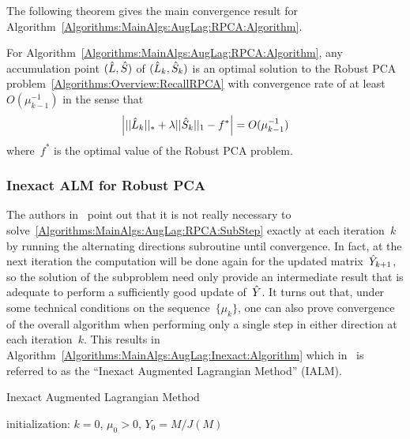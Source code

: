 The following theorem gives the main convergence result for Algorithm~\ref{Algorithms:MainAlgs:AugLag:RPCA:Algorithm}.\\

\begin{theorem}
For Algorithm~\ref{Algorithms:MainAlgs:AugLag:RPCA:Algorithm}, any accumulation point $({\hat{L}},{\hat{S}})$ of $({\hat{L}}_k,{\hat{S}}_k)$ is an optimal solution to the Robust PCA problem~\eqref{Algorithms:Overview:RecallRPCA} with convergence rate of at least~$O(\mu_{k-1}^{-1})$ in the sense that
\begin{align*}
\left| ||{\hat{L}}_k||_* + \lambda ||{\hat{S}}_k||_1 - f^* \right| = O(\mu_{k-1}^{-1})
\end{align*}
where~$f^*$ is the optimal value of the Robust PCA problem.
\end{theorem}



\subsubsection{Inexact ALM for Robust PCA}
\label{Algorithms:MainAlgs:AugLag:Inexact:Subsubsec}

The authors in~\cite{Lin:2010fk} point out that it is not really necessary to solve~\eqref{Algorithms:MainAlgs:AugLag:RPCA:SubStep} exactly at each iteration~$k$ by running the alternating directions subroutine until convergence. In fact, at the next iteration the computation will be done again for the updated matrix~${\hat{Y}}_{k+1}$, so the solution of the subproblem need only provide an intermediate result that is adequate to perform a sufficiently good update of~${\hat{Y}}$. It turns out that, under some technical conditions on the sequence~$\{\mu_k\}$, one can also prove convergence of the overall algorithm when performing only a single step in either direction at each iteration~$k$.  This results in Algorithm~\ref{Algorithms:MainAlgs:AugLag:Inexact:Algorithm} which in~\cite{Lin:2010fk} is referred to as the ``Inexact Augmented Lagrangian Method'' (IALM).

\begin{algorithm}
\caption{Inexact Augmented Lagrangian Method}
initialization: $k=0$, $\mu_0>0$, $Y_0 = M/J(M)$\;
\label{Algorithms:MainAlgs:AugLag:Inexact:Algorithm}
\end{algorithm}

